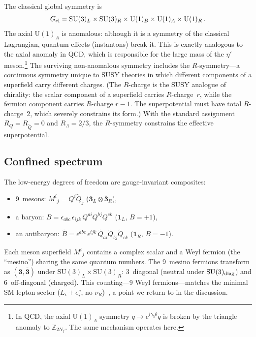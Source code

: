 \documentclass[12pt,a4paper]{article}
\newcommand{\SU}{\mathrm{SU}}
\newcommand{\UU}{\mathrm{U}}
\newcommand{\Nf}{N_f}
\begin{document}
The classical global symmetry is
\begin{equation}
  G_{\rm cl} = \SU(3)_L \times \SU(3)_R \times \UU(1)_B
    \times \UU(1)_A \times \UU(1)_R\,.
  \label{eq:Gcl}
\end{equation}
The axial $\UU(1)_A$ is anomalous: although it is a symmetry of the
classical Lagrangian, quantum effects (instantons) break it. This is
exactly analogous to the axial anomaly in QCD, which is responsible
for the large mass of the $\eta'$ meson.\footnote{In QCD, the axial
$\UU(1)_A$ symmetry $q \to e^{i\gamma_5\theta}q$ is broken by the
triangle anomaly to $\mathbb{Z}_{2\Nf}$. The same mechanism operates
here.} The surviving non-anomalous symmetry includes the
$R$-symmetry---a continuous symmetry unique to SUSY theories in which
different components of a superfield carry different charges.
(The $R$-charge is the SUSY analogue of chirality: the scalar
component of a superfield carries $R$-charge~$r$, while the fermion
component carries $R$-charge $r{-}1$. The superpotential must have
total $R$-charge~2, which severely constrains its form.)
With the standard assignment $R_Q = R_{\tilde{Q}} = 0$ and
$R_\Lambda = 2/3$, the $R$-symmetry constrains
the effective superpotential.

\subsection{Confined spectrum}

The low-energy degrees of freedom are gauge-invariant composites:
\begin{itemize}
  \item 9~mesons: $M^i{}_j = Q^i \tilde{Q}_j$
    \quad ($\mathbf{3}_L \otimes \bar{\mathbf{3}}_R$),
  \item a baryon: $B = \epsilon_{abc}\,\epsilon_{ijk}\,Q^{ai}Q^{bj}Q^{ck}$
    \quad ($\mathbf{1}_L$, $B = +1$),
  \item an antibaryon: $\tilde{B} = \epsilon^{abc}\,\epsilon^{ijk}\,
    \tilde{Q}_{ai}\tilde{Q}_{bj}\tilde{Q}_{ck}$
    \quad ($\mathbf{1}_R$, $B = -1$).
\end{itemize}
Each meson superfield $M^i{}_j$ contains a complex scalar and a Weyl
fermion (the ``mesino'') sharing the same quantum numbers. The 9~mesino
fermions transform as $(\mathbf{3}, \bar{\mathbf{3}})$ under
$\SU(3)_L \times \SU(3)_R$: 3~diagonal (neutral under
$\SU(3)_{\rm diag}$) and 6~off-diagonal (charged). This counting---9
Weyl fermions---matches the minimal SM lepton sector
($L_i + e^c_i$, no $\nu_R$)~\cite{ArkaniHamed:1998wc}, a point we return to in the discussion.
\end{document}
